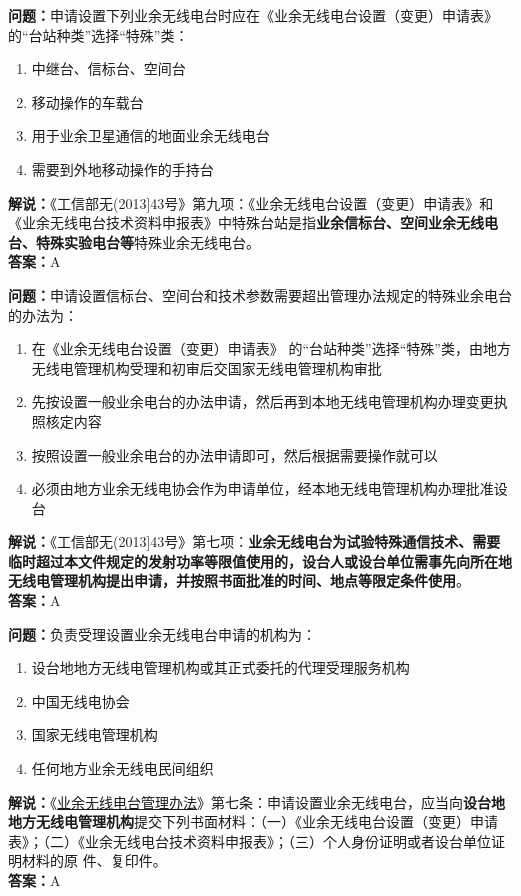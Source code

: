 \textbf{问题：}申请设置下列业余无线电台时应在《业余无线电台设置（变更）申请表》 的“台站种类”选择“特殊”类：
\begin{enumerate}[label=\Alph*), leftmargin=1cm]
	\item 中继台、信标台、空间台
	\item 移动操作的车载台
	\item 用于业余卫星通信的地面业余无线电台
	\item 需要到外地移动操作的手持台
\end{enumerate}
\textbf{解说：}《工信部无(2013]43号》第九项：《业余无线电台设置（变更）申请表》和《业余无线电台技术资料申报表》中特殊台站是指\textbf{业余信标台、空间业余无线电台、特殊实验电台等}特殊业余无线电台。\\\textbf{答案：}A

\textbf{问题：}申请设置信标台、空间台和技术参数需要超出管理办法规定的特殊业余电台的办法为：
\begin{enumerate}[label=\Alph*), leftmargin=1cm]
	\item 在《业余无线电台设置（变更）申请表》 的“台站种类”选择“特殊”类，由地方无线电管理机构受理和初审后交国家无线电管理机构审批
	\item 先按设置一般业余电台的办法申请，然后再到本地无线电管理机构办理变更执照核定内容
	\item 按照设置一般业余电台的办法申请即可，然后根据需要操作就可以
	\item 必须由地方业余无线电协会作为申请单位，经本地无线电管理机构办理批准设台
\end{enumerate}
\textbf{解说：}《工信部无(2013]43号》第七项：\textbf{业余无线电台为试验特殊通信技术、需要临时超过本文件规定的发射功率等限值使用的，设台人或设台单位需事先向所在地无线电管理机构提出申请，并按照书面批准的时间、地点等限定条件使用}。\\\textbf{答案：}A

\textbf{问题：}负责受理设置业余无线电台申请的机构为：
\begin{enumerate}[label=\Alph*), leftmargin=1cm]
	\item 设台地地方无线电管理机构或其正式委托的代理受理服务机构
	\item 中国无线电协会
	\item 国家无线电管理机构
	\item 任何地方业余无线电民间组织
\end{enumerate}
\textbf{解说：}《\href{https://www.miit.gov.cn/jgsj/zfs/bmgz/art/2020/art_147b69815b3641caad9047735f94c860.html}{业余无线电台管理办法}》第七条：申请设置业余无线电台，应当向\textbf{设台地地方无线电管理机构}提交下列书面材料：（一）《业余无线电台设置（变更）申请表》；（二）《业余无线电台技术资料申报表》；（三）个人身份证明或者设台单位证明材料的原
件、复印件。\\\textbf{答案：}A

